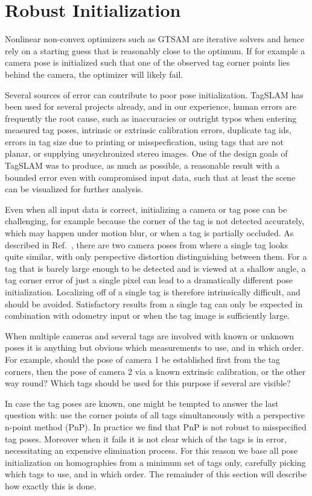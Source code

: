 \section{Robust Initialization}
\label{sec:robustinit}
Nonlinear non-convex optimizers such as GTSAM \cite{kaess2011} are
iterative solvers and hence rely on a starting guess that is
reasonably close to the optimum. If for example a camera pose is
initialized such that one of the observed tag corner points lies
behind the camera, the optimizer will likely fail.

Several sources of error can contribute to poor pose
initialization. TagSLAM has been used for several projects already,
and in our experience, human errors are frequently the root cause,
such as inaccuracies or outright typos when entering measured tag
poses, intrinsic or extrinsic calibration errors, duplicate tag ids,
errors in tag size due to printing or misspecfication, using tags that
are not planar, or supplying unsychronized stereo images. One of the
design goals of TagSLAM was to produce, as much as possible, a
reasonable result with a bounded error even with compromised input
data, such that at least the scene can be visualized for further
analysis.

Even when all input data is correct, initializing a camera or tag pose
can be challenging, for example because the corner of the tag is not
detected accurately, which may happen under motion blur, or when a tag
is partially occluded.  As described in Ref.\ \cite{schweighofer2006}, there
are two camera poses from where a single tag looks quite similar, with
only perspective distortion distinguishing between them. For a tag
that is barely large enough to be detected and is viewed at a shallow
angle, a tag corner error of just a single pixel can lead to a
dramatically different pose initialization. Localizing off of a single
tag is therefore intrinsically difficult, and should be
avoided. Satisfactory results from a single tag can only be expected
in combination with odometry input or when the tag image is
sufficiently large.

When multiple cameras and several tags are involved with known or
unknown poses it is anything but obvious which measurements to use,
and in which order.  For example, should the pose of camera 1 be
established first from the tag corners, then the pose of camera 2 via
a known extrinsic calibration, or the other way round? Which tags
should be used for this purpose if several are visible?

In case the tag poses are known, one might be tempted to answer the
last question with: use the corner points of all tags simultaneously
with a perspective n-point method (PnP). In
practice we find that PnP is not robust to misspecified tag
poses. Moreover when it fails it is not clear which of the tags is in
error, necessitating an expensive elimination process. For this reason
we base all pose initialization on homographies \cite{ma2003} from a
minimum set of tags only, carefully picking which tags to use, and in
which order. The remainder of this section will describe how exactly
this is done.

